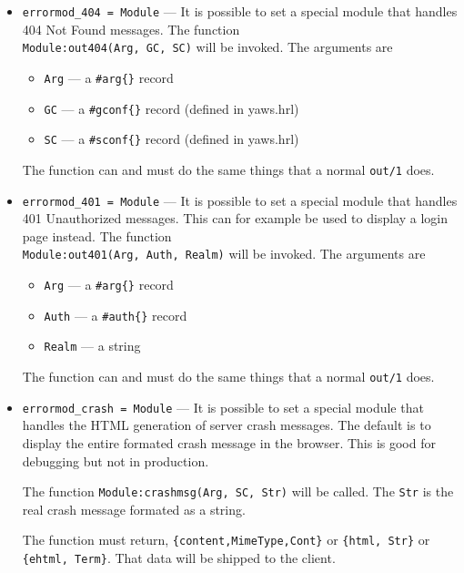 \documentclass[11pt,oneside,english]{book}
\begin{document}
\begin{itemize}
\item       \verb+errormod_404 = Module+ ---
              It is possible to set a special module that handles 404 Not Found
              messages. The function\\ \verb+Module:out404(Arg, GC, SC)+ will be
              invoked. The arguments are
              \begin{itemize}
              \item \verb+Arg+ --- a \verb+#arg{}+ record
              \item \verb+GC+ --- a \verb+#gconf{}+ record (defined in yaws.hrl)
              \item \verb+SC+ --- a \verb+#sconf{}+ record (defined in yaws.hrl)
              \end{itemize}
              The function can and must do the same things that a normal
              \verb+out/1+ does.

\item       \verb+errormod_401 = Module+ ---
              It is possible to set a special module that handles 401
              Unauthorized messages. This can for example be used to display a
              login page instead. The function \\
              \verb+Module:out401(Arg, Auth, Realm)+ will be invoked. The
              arguments are
              \begin{itemize}
              \item \verb+Arg+ --- a \verb+#arg{}+ record
              \item \verb+Auth+ --- a \verb+#auth{}+ record
              \item \verb+Realm+ --- a string
              \end{itemize}
              The function can and must do the same things that a normal
              \verb+out/1+ does.

\item       \verb+errormod_crash = Module+ ---
              It is possible to set a special module that handles the HTML
              generation of server crash messages. The default is to display the
              entire formated crash message in the browser. This is good for
              debugging but not in production.

              The function \verb+Module:crashmsg(Arg, SC, Str)+ will be
              called. The \verb+Str+ is the real crash message formated as a
              string.

              The function must return, \verb+{content,MimeType,Cont}+ or
              \verb+{html, Str}+ or \verb+{ehtml, Term}+. That data will be
              shipped to the client.


\end{itemize}
\end{document}
